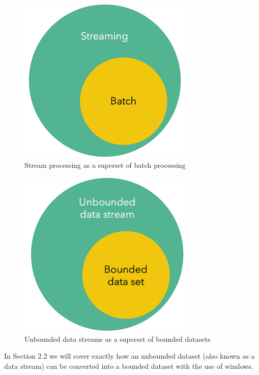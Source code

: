 \begin{figure}[!htb]
    \begin{center}
      \includegraphics[scale=0.5]{figures/streaming-subset-batch.png}
      \caption{Stream processing as a superset of batch processing}
      \label{fig:stream-superset}
    \end{center}
\end{figure}

\begin{figure}[!htb]
    \begin{center}
      \includegraphics[scale=0.5]{figures/unbounded-superset-bounded.png}
      \caption{Unbounded data streams as a superset of bounded datasets}
      \label{fig:unbounded-bounded-superset}
    \end{center}
\end{figure}


In Section 2.2 we will cover exactly how an unbounded dataset (also known as a data stream) can be converted into a bounded dataset with the use of windows.

